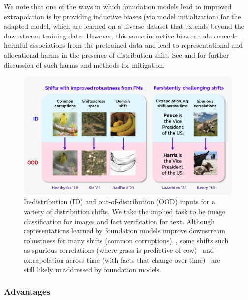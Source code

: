 We note that one of the ways in which foundation models lead to improved extrapolation is by providing inductive biases (via model initialization) for the adapted model, which are learned on a diverse dataset that extends beyond the downstream training data. However, this same inductive bias can also encode harmful associations from the pretrained data and lead to representational and allocational harms in the presence of distribution shift. See  and  for further discussion of such harms and methods for mitigation.


\begin{figure}[t]
\centering
\includegraphics[width=0.85\linewidth]{technology/figures/Robustness.png}
\caption{\label{fig:robustness}  In-distribution (ID) and out-of-distribution (OOD) inputs for a variety of distribution shifts. We take the implied task to be image classification for images and fact verification for text.  Although representations learned by foundation models improve downstream robustness for many shifts (\eg common corruptions)~\citep{hendrycks2019benchmarking,xie2021innout,radford2021learning}, some shifts such as spurious correlations (where grass is predictive of cow)~\citep{beery2020iwildcam} and extrapolation across time (with facts that change over time)~\citep{lazaridou2021pitfalls} are still likely unaddressed by foundation models.
}
\end{figure}

\subsubsection{Advantages}
\label{sec:robustness-advantages}


